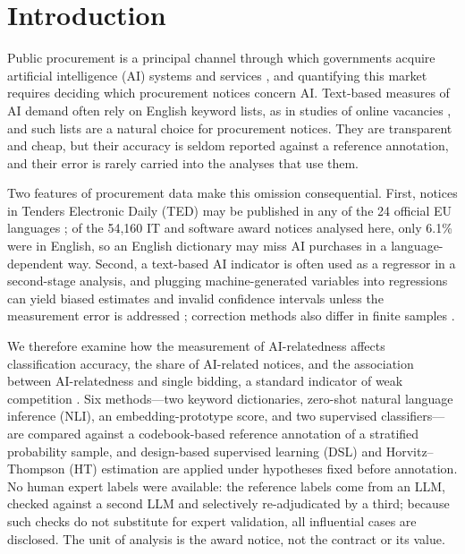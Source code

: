 \documentclass[runningheads]{llncs}
\begin{document}
\section{Introduction}
Public procurement is a principal channel through which governments acquire artificial intelligence (AI) systems and services \cite{hickok2022}, and quantifying this market requires deciding which procurement notices concern AI. Text-based measures of AI demand often rely on English keyword lists, as in studies of online vacancies \cite{acemoglu2022,babina2024}, and such lists are a natural choice for procurement notices. They are transparent and cheap, but their accuracy is seldom reported against a reference annotation, and their error is rarely carried into the analyses that use them.

Two features of procurement data make this omission consequential. First, notices in Tenders Electronic Daily (TED) may be published in any of the 24 official EU languages \cite{ahmia2018}; of the 54,160 IT and software award notices analysed here, only 6.1\% were in English, so an English dictionary may miss AI purchases in a language-dependent way. Second, a text-based AI indicator is often used as a regressor in a second-stage analysis, and plugging machine-generated variables into regressions can yield biased estimates and invalid confidence intervals unless the measurement error is addressed \cite{battaglia2025,egami2023}; correction methods also differ in finite samples \cite{audinet2025}.

We therefore examine how the measurement of AI-relatedness affects classification accuracy, the share of AI-related notices, and the association between AI-relatedness and single bidding, a standard indicator of weak competition \cite{fazekas2016}. Six methods---two keyword dictionaries, zero-shot natural language inference (NLI), an embedding-prototype score, and two supervised classifiers---are compared against a codebook-based reference annotation of a stratified probability sample, and design-based supervised learning (DSL) \cite{egami2023} and Horvitz--Thompson (HT) estimation are applied under hypotheses fixed before annotation. No human expert labels were available: the reference labels come from an LLM, checked against a second LLM and selectively re-adjudicated by a third; because such checks do not substitute for expert validation, all influential cases are disclosed. The unit of analysis is the award notice, not the contract or its value.
\end{document}
